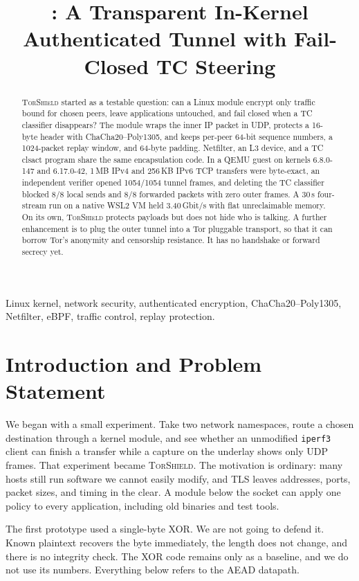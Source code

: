 \documentclass[conference]{IEEEtran}
\title{\sys: A Transparent In-Kernel Authenticated Tunnel with Fail-Closed TC Steering}
\author{
\IEEEauthorblockN{Roshan Srikanth}
\IEEEauthorblockA{Amrita Vishwa Vidyapeetham\\
Email: roshansrikanth21@gmail.com}
\and
\IEEEauthorblockN{Yash Yashuday}
\IEEEauthorblockA{Amrita Vishwa Vidyapeetham\\
Email: yyashuday@gmail.com}
\and
\IEEEauthorblockN{Dr. S. UdhayaKumar}
\IEEEauthorblockA{Amrita Vishwa Vidyapeetham\\
Email: sudhayakumar@ch.amrita.edu}
}
\newcommand{\sys}{\textsc{TorShield}}
\newcommand{\code}[1]{\texttt{#1}}
\begin{document}
\maketitle

\begin{abstract}
\sys{} started as a testable question: can a Linux module encrypt only traffic bound for chosen peers, leave applications untouched, and fail closed when a TC classifier disappears? The module wraps the inner IP packet in UDP, protects a 16-byte header with ChaCha20--Poly1305, and keeps per-peer 64-bit sequence numbers, a 1024-packet replay window, and 64-byte padding. Netfilter, an L3 device, and a TC clsact program share the same encapsulation code. In a QEMU guest on kernels 6.8.0-147 and 6.17.0-42, 1\,MB IPv4 and 256\,KB IPv6 TCP transfers were byte-exact, an independent verifier opened 1054/1054 tunnel frames, and deleting the TC classifier blocked 8/8 local sends and 8/8 forwarded packets with zero outer frames. A 30\,s four-stream run on a native WSL2 VM held 3.40\,Gbit/s with flat unreclaimable memory. On its own, \sys{} protects payloads but does not hide who is talking. A further enhancement is to plug the outer tunnel into a Tor pluggable transport, so that it can borrow Tor's anonymity and censorship resistance. It has no handshake or forward secrecy yet.
\end{abstract}

\begin{IEEEkeywords}
Linux kernel, network security, authenticated encryption, ChaCha20--Poly1305, Netfilter, eBPF, traffic control, replay protection.
\end{IEEEkeywords}

\section{Introduction and Problem Statement}
We began with a small experiment. Take two network namespaces, route a chosen destination through a kernel module, and see whether an unmodified \code{iperf3} client can finish a transfer while a capture on the underlay shows only UDP frames. That experiment became \sys{}. The motivation is ordinary: many hosts still run software we cannot easily modify, and TLS leaves addresses, ports, packet sizes, and timing in the clear. A module below the socket can apply one policy to every application, including old binaries and test tools.

The first prototype used a single-byte XOR. We are not going to defend it. Known plaintext recovers the byte immediately, the length does not change, and there is no integrity check. The XOR code remains only as a baseline, and we do not use its numbers. Everything below refers to the AEAD datapath.
\end{document}
